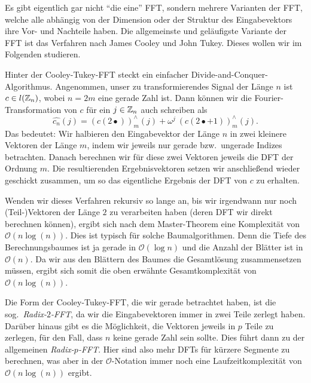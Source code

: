 Es gibt eigentlich gar nicht \enquote{die eine} FFT, sondern mehrere Varianten der FFT, welche alle 
abhängig von der Dimension oder der Struktur des Eingabevektors ihre Vor- und Nachteile haben. Die 
allgemeinste und geläufigste Variante der FFT ist das Verfahren nach James Cooley und John Tukey. 
Dieses wollen wir im Folgenden studieren.

Hinter der Cooley-Tukey-FFT steckt ein einfacher Divide-and-Conquer-Algorithmus. Angenommen, unser
zu transformierendes Signal der Länge $ n $ ist $ c \in l(\mathbb{Z}_{n}) $, wobei $ n = 2m $ eine gerade 
Zahl ist. Dann können wir die Fourier-Transformation von $ c $ für ein $ j \in \mathbb{Z}_{n} $ auch
schreiben als
\[
    \widehat{c_{n}}(j) 
  = (c(2\bullet))_{m}^{\wedge}(j) + \omega^{j} \ (c(2\bullet + 1))_{m}^{\wedge}(j).
\]
Das bedeutet: Wir halbieren den Eingabevektor der Länge $ n $ in zwei kleinere Vektoren der Länge
$ m $, indem wir jeweils nur gerade bzw.\ ungerade Indizes betrachten. Danach berechnen wir für 
diese zwei Vektoren jeweils die DFT der Ordnung $ m $. Die resultierenden Ergebnisvektoren setzen 
wir anschließend wieder geschickt zusammen, um so das eigentliche Ergebnis der DFT von $ c $ zu 
erhalten.

Wenden wir dieses Verfahren rekursiv so lange an, bis wir irgendwann nur noch (Teil-)Vektoren der 
Länge $ 2 $ zu verarbeiten haben (deren DFT wir direkt berechnen können), ergibt sich nach dem
Master-Theorem eine Komplexität von $ \mathcal{O}(n \log(n)) $. Dies ist typisch für solche 
Baumalgorithmen. Denn die Tiefe des Berechnungsbaumes ist ja gerade in $ \mathcal{O}(\log n) $ und
die Anzahl der Blätter ist in $ \mathcal{O}(n) $. Da wir aus den Blättern des Baumes die 
Gesamtlösung
zusammensetzen müssen, ergibt sich somit die oben erwähnte Gesamtkomplexität von
$ \mathcal{O}(n \log(n)) $.

Die Form der Cooley-Tukey-FFT, die wir gerade betrachtet haben, ist die sog.\ \emph{Radix-$ 2 
$-FFT}, da wir die Eingabevektoren immer in zwei Teile zerlegt haben. Darüber hinaus gibt es die 
Möglichkeit, die Vektoren jeweils in $ p $ Teile zu zerlegen, für den Fall, dass $ n $ keine gerade 
Zahl sein sollte. Dies führt dann zu der allgemeinen \emph{Radix-$ p $-FFT}. Hier sind also mehr 
DFTs für kürzere Segmente zu berechnen, was aber in der $ \mathcal{O} $-Notation immer noch eine 
Laufzeitkomplexität von $ \mathcal{O}(n\log(n)) $ ergibt.

